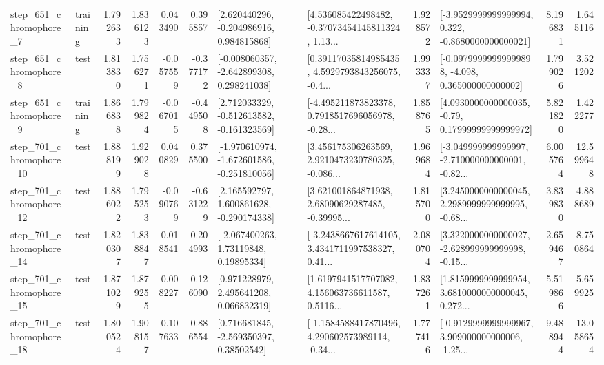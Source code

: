 \begin{tabular}{llrrrrllrlrr}
   step\_651\_chromophore\_7 &  training &      1.792633 &    1.836123 &      0.043490 &  0.395857 &    [2.620440296, -0.204986916, 0.984815868] &  [4.536085422498482, -0.37073454145811324, 1.13... &       1.928572 &  [-3.9529999999999994, 0.322, -0.8680000000000021] &            8.196831 &          1.645116 \\
   step\_651\_chromophore\_8 &      test &      1.813830 &    1.756271 &     -0.057559 & -0.377172 &   [-0.008060357, -2.642899308, 0.298241038] &  [0.39117035814985435, 4.5929793843256075, -0.4... &       1.993337 &  [-0.09799999999999898, -4.098, 0.365000000000002] &            1.799026 &          3.521202 \\
   step\_651\_chromophore\_9 &  training &      1.866838 &    1.799824 &     -0.067015 & -0.449508 &   [2.712033329, -0.512613582, -0.161323569] &  [-4.495211873823378, 0.7918517696056978, -0.28... &       1.858765 &   [4.0930000000000035, -0.79, 0.17999999999999972] &            5.821820 &          1.422277 \\
  step\_701\_chromophore\_10 &      test &      1.888199 &    1.929028 &      0.040829 &  0.375500 &  [-1.970610974, -1.672601586, -0.251810056] &  [3.456175306263569, 2.9210473230780325, -0.086... &       1.969684 &  [-3.049999999999997, -2.710000000000001, -0.82... &            6.005764 &         12.599648 \\
  step\_701\_chromophore\_12 &      test &      1.886022 &    1.795253 &     -0.090769 & -0.631229 &    [2.165592797, 1.600861628, -0.290174338] &  [3.621001864871938, 2.68090629287485, -0.39995... &       1.815700 &  [3.2450000000000045, 2.2989999999999995, -0.68... &            3.839830 &          4.888689 \\
  step\_701\_chromophore\_14 &      test &      1.820307 &    1.838847 &      0.018541 &  0.204993 &      [-2.067400263, 1.73119848, 0.19895334] &  [-3.2438667617614105, 3.4341711997538327, 0.41... &       2.080704 &  [3.3220000000000027, -2.628999999999998, -0.15... &            2.659467 &          8.750864 \\
  step\_701\_chromophore\_15 &      test &      1.871029 &    1.879255 &      0.008227 &  0.126090 &     [0.971228979, 2.495641208, 0.066832319] &  [1.6197941517707082, 4.156063736611587, 0.5116... &       1.837261 &  [1.8159999999999954, 3.6810000000000045, 0.272... &            5.519866 &          5.659925 \\
  step\_701\_chromophore\_18 &      test &      1.800524 &    1.908157 &      0.107633 &  0.886554 &     [0.716681845, -2.569350397, 0.38502542] &  [-1.1584588417870496, 4.290602573989114, -0.34... &       1.777416 &  [-0.9129999999999967, 3.909000000000006, -1.25... &            9.488944 &         13.058654 \\

\end{tabular}
